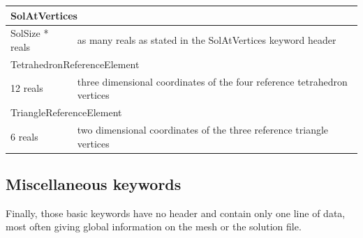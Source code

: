 \documentclass[a4paper,12pt]{article}
\begin{document}
\begin{longtable}{|m{4cm}|m{11cm}|}
\multicolumn{2}{|l|}{SolAtVertices} \\
\hline
SolSize * reals & as many reals as stated in the SolAtVertices keyword header \\
\hline\hline

\multicolumn{2}{|l|}{TetrahedronReferenceElement} \\
\hline
12 reals & three dimensional coordinates of the four reference tetrahedron vertices \\
\hline\hline

\multicolumn{2}{|l|}{TriangleReferenceElement} \\
\hline
6 reals & two dimensional coordinates of the three reference triangle vertices \\
\hline

\end{longtable}


\subsection{Miscellaneous keywords}

Finally, those basic keywords have no header and contain only one line of data, most often giving global information on the mesh or the solution file.
\end{document}
